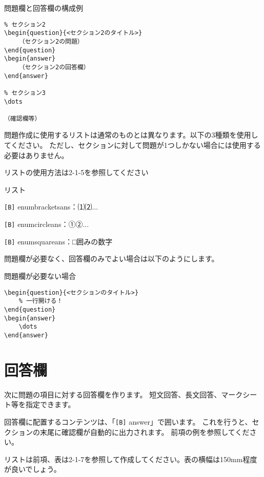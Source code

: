 \begin{multicols*}{2}
\begin{framebox-ref}{問題欄と回答欄の構成例}
\begin{verbatim}
% セクション2
\begin{question}{<セクション2のタイトル>}
    （セクション2の問題）
\end{question}
\begin{answer}
    （セクション2の回答欄）
\end{answer}
        
% セクション3
\dots

（確認欄等）
\end{verbatim}
\end{framebox-ref}

問題作成に使用するリストは通常のものとは異なります。以下の3種類を使用してください。
ただし、セクションに対して問題が1つしかない場合には使用する必要はありません。

リストの使用方法は2-1-5を参照してください
\begin{framebox-simple}{リスト}
    \begin{reitemize}
        \item \verb|[B]| enumbracketsans：⑴⑵...
        \item \verb|[B]| enumcircleans：①②...
        \item \verb|[B]| enumsquareans：□囲みの数字
    \end{reitemize}
\end{framebox-simple}

問題欄が必要なく、回答欄のみでよい場合は以下のようにします。
\begin{framebox-simple}{問題欄が必要ない場合}
\begin{verbatim}
\begin{question}{<セクションのタイトル>}
    % 一行開ける！
\end{question}
\begin{answer}
    \dots
\end{answer}
\end{verbatim}
\end{framebox-simple}


\section{回答欄}
次に問題の項目に対する回答欄を作ります。
短文回答、長文回答、マークシート等を指定できます。

回答欄に配置するコンテンツは、「\verb|[B]| answer」で囲います。
これを行うと、セクションの末尾に確認欄が自動的に出力されます。
前項の例を参照してください。

リストは前項、表は2-1-7を参照して作成してください。表の横幅は150mm程度が良いでしょう。


\end{multicols*}
